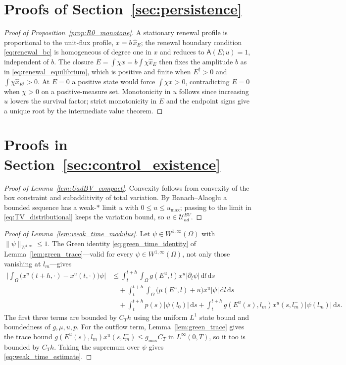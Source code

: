 \documentclass[pdflatex,sn-mathphys-num]{sn-jnl}
\newcommand{\Om}{\Omega}
\newcommand{\dd}{\,\mathrm{d}}
\newcommand{\UadBV}{\mathcal{U}_{ad}^{BV}}
\theoremstyle{plain}
\theoremstyle{definition}
\theoremstyle{remark}
\begin{document}
\section{Proofs of Section~\ref{sec:persistence}}

\begin{proof}[Proof of Proposition~\ref{prop:R0_monotone}]
A stationary renewal profile is proportional to the unit-flux profile,
$x=b\,\hat x_E$; the renewal boundary condition \eqref{eq:renewal_bc} is
homogeneous of degree one in $x$ and reduces to $\mathsf A(E;u)=1$, independent of
$b$. The closure $E=\int\chi x=b\int\chi\hat x_E$ then fixes the amplitude $b$ as in
\eqref{eq:renewal_equilibrium}, which is positive and finite when $E^{\dagger}>0$
and $\int\chi\hat x_{E^{\dagger}}>0$. At $E=0$ a positive state would force
$\int\chi x>0$, contradicting $E=0$ when $\chi>0$ on a positive-measure set.
Monotonicity in $u$ follows since increasing $u$ lowers
the survival factor; strict monotonicity in $E$ and the endpoint signs give a
unique root by the intermediate value theorem.
\end{proof}

\section{Proofs in Section~\ref{sec:control_existence}}

\begin{proof}[Proof of Lemma~\ref{lem:UadBV_compact}]
Convexity follows from convexity of the box constraint and subadditivity of total
variation. By Banach--Alaoglu a bounded sequence has a weak-$\ast$ limit $u$ with
$0\le u\le u_{\max}$; passing to the limit in \eqref{eq:TV_distributional} keeps
the variation bound, so $u\in\UadBV$.
\end{proof}

\begin{proof}[Proof of Lemma~\ref{lem:weak_time_modulus}]
Let $\psi\in W^{1,\infty}(\Om)$ with $\|\psi\|_{W^{1,\infty}}\le1$. The Green
identity \eqref{eq:green_time_identity} of Lemma~\ref{lem:green_trace}---valid for
every $\psi\in W^{1,\infty}(\Om)$, not only those vanishing at $l_m$---gives
\begin{align*}
\Big|\int_\Om\big(x^u(t+h,\cdot)-x^u(t,\cdot)\big)\psi\Big|
&\le
\int_t^{t+h}\!\!\int_\Om g(E^u,l)x^u|\partial_l\psi|\dd l\dd s
\nonumber\\
&\quad+\int_t^{t+h}\!\!\int_\Om\big(\mu(E^u,l)+u\big)x^u|\psi|\dd l\dd s
\nonumber\\
&\quad+\int_t^{t+h} p(s)|\psi(l_0)|\dd s
+\int_t^{t+h} g(E^u(s),l_m)x^u(s,l_m^-)|\psi(l_m)|\dd s.
\end{align*}
The first three terms are bounded by $C_T h$ using the uniform $L^1$ state bound
and boundedness of $g,\mu,u,p$. For the outflow term, Lemma~\ref{lem:green_trace}
gives the trace bound $g(E^u(s),l_m)x^u(s,l_m^-)\le g_{\max}C_T$ in
$L^\infty(0,T)$, so it too is bounded by $C_Th$. Taking the supremum over $\psi$
gives \eqref{eq:weak_time_estimate}.
\end{proof}
\end{document}
